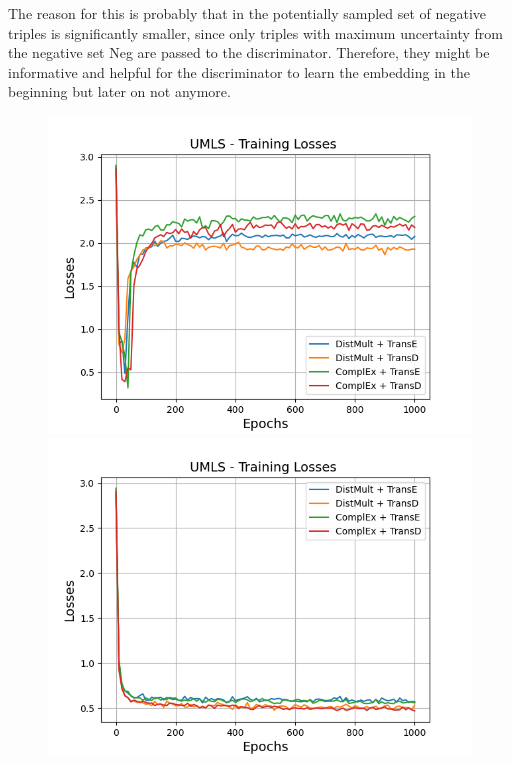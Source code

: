The reason for this is probably that in \usmax the potentially sampled set of negative triples is significantly smaller, since only triples with maximum uncertainty from the negative set Neg are passed to the discriminator.
Therefore, they might be informative and helpful for the discriminator to learn the embedding in the beginning but later on not anymore.
\begin{figure}[H]
    \centering
    \begin{minipage}{.5\textwidth}
      \centering
      \includegraphics[width=0.9\linewidth]{figures/results/gan_train/not_pretrained/uncertainty/max/entropy/umls/1k_epochs/uncertainty_umls_losses.png}
    \end{minipage}%
    \begin{minipage}{.5\textwidth}
      \centering
      \includegraphics[width=0.9\linewidth]{figures/results/gan_train/not_pretrained/uncertainty/max_distribution/entropy/umls/1k_epochs/uncertainty_umls_losses.png}

\end{minipage}
\end{figure}
